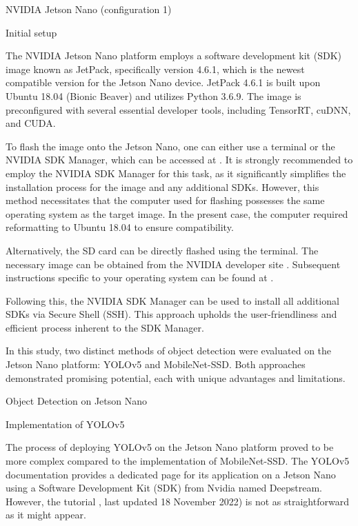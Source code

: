 NVIDIA Jetson Nano (configuration 1)

Initial setup

The NVIDIA Jetson Nano platform employs a software development kit (SDK) image known as JetPack, specifically version 4.6.1, which is the newest compatible version for the Jetson Nano device. JetPack 4.6.1 is built upon Ubuntu 18.04 (Bionic Beaver) and utilizes Python 3.6.9. The image is preconfigured with several essential developer tools, including TensorRT, cuDNN, and CUDA.

To flash the image onto the Jetson Nano, one can either use a terminal or the NVIDIA SDK Manager, which can be accessed at \cite{Jetson_sdk_manager}. It is strongly recommended to employ the NVIDIA SDK Manager for this task, as it significantly simplifies the installation process for the image and any additional SDKs. However, this method necessitates that the computer used for flashing possesses the same operating system as the target image. In the present case, the computer required reformatting to Ubuntu 18.04 to ensure compatibility.



Alternatively, the SD card can be directly flashed using the terminal. The necessary image can be obtained from the NVIDIA developer site \cite{Jetpack_461}. Subsequent instructions specific to your operating system can be found at \cite{Jetpack_461_write_to_sd}.

Following this, the NVIDIA SDK Manager can be used to install all additional SDKs via Secure Shell (SSH). This approach upholds the user-friendliness and efficient process inherent to the SDK Manager. 



In this study, two distinct methods of object detection were evaluated on the Jetson Nano platform: YOLOv5 and MobileNet-SSD. Both approaches demonstrated promising potential, each with unique advantages and limitations.

Object Detection on Jetson Nano

Implementation of YOLOv5


The process of deploying YOLOv5 on the Jetson Nano platform proved to be more complex compared to the implementation of MobileNet-SSD. The YOLOv5 documentation provides a dedicated page for its application on a Jetson Nano using a Software Development Kit (SDK) from Nvidia named Deepstream. However, the tutorial \cite{yolo_on_jetson}, last updated 18 November 2022) is not as straightforward as it might appear.


